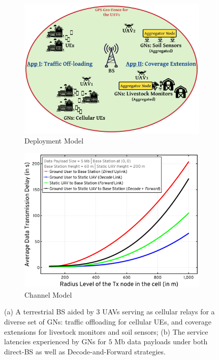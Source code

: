 \documentclass[12pt, draftcls, onecolumn]{IEEEtran}
\theoremstyle{plain}
\theoremstyle{definition}
\theoremstyle{remark}
\begin{document}
\begin{figure} [t]
     \begin{subfigure}{0.504\linewidth}
         \centering
         \includegraphics[width=0.9\linewidth]{figs/Deployment_Model.png}
         \caption{Deployment Model}
         \label{F1}
     \end{subfigure}
     \begin{subfigure}{0.496\linewidth}
         \centering
         \includegraphics[width=0.9\linewidth]{figs/Channel_Model.png}
         \caption{Channel Model}
         \label{F2}
     \end{subfigure}
     \vspace{-2mm}
     \caption{(a) A terrestrial BS aided by $3$ UAVs serving as cellular relays for a diverse set of GNs: traffic offloading for cellular UEs, and coverage extensions for livestock monitors and soil sensors; (b) The service latencies experienced by GNs for $5$ Mb data payloads under both direct-BS as well as Decode-and-Forward strategies.}
     \label{F1andF2}
\end{figure}
\end{document}
